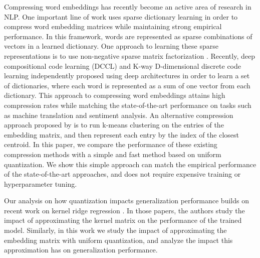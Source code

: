Compressing word embeddings has recently become an active area of research in NLP.
One important line of work uses sparse dictionary learning in order to compress word embedding matrices while maintaining strong empirical performance.
In this framework, words are represented as sparse combinations of vectors in a learned dictionary.
One approach to learning these sparse representations is to use non-negative sparse matrix factorization \citep{murphy12,sparse16}.
Recently, deep compositional code learning (DCCL) \cite{dccl17} and K-way D-dimensional discrete code learning \cite{kway18} independently proposed using deep architectures in order to learn a set of dictionaries, where each word is represented as a sum of one vector from each dictionary.
This approach to compressing word embeddings attains high compression rates while matching the state-of-the-art performance on tasks such as machine translation and sentiment analysis.
An alternative compression approach proposed by \citet{andrews16} is to run k-means clustering on the entries of the embedding matrix, and then represent each entry by the index of the closest centroid.
In this paper, we compare the performance of these existing compression methods with a simple and fast method based on uniform quantization.
We show this simple approach can match the empirical performance of the state-of-the-art approaches, and does not require expensive training or hyperparameter tuning.

Our analysis on how quantization impacts generalization performance builds on recent work on kernel ridge regression \citep{avron17, lprff18}.
In those papers, the authors study the impact of approximating the kernel matrix on the performance of the trained model.
Similarly, in this work we study the impact of approximating the embedding matrix with uniform quantization, and analyze the impact this approximation has on generalization performance.

